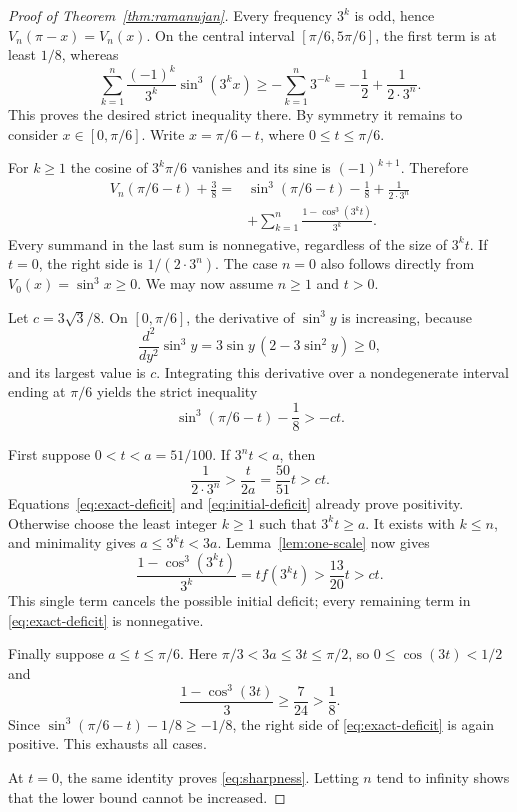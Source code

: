 \documentclass[11pt,a4paper]{article}
\numberwithin{equation}{section}
\theoremstyle{remark}
\begin{document}
\begin{proof}[Proof of Theorem~\ref{thm:ramanujan}]
Every frequency $3^k$ is odd, hence
$V_n(\pi-x)=V_n(x)$. On the central interval
$[\pi/6,5\pi/6]$, the first term is at least $1/8$, whereas
\[
 \sum_{k=1}^n\frac{(-1)^k}{3^k}\sin^3(3^kx)
 \ge-\sum_{k=1}^n3^{-k}
 =-\frac12+\frac1{2\cdot3^n}.
\]
This proves the desired strict inequality there. By symmetry it remains
to consider $x\in[0,\pi/6]$. Write $x=\pi/6-t$, where
$0\le t\le\pi/6$.

For $k\ge1$ the cosine of $3^k\pi/6$ vanishes and its sine is
$(-1)^{k+1}$. Therefore
\begin{equation}\label{eq:exact-deficit}
\begin{split}
 V_n(\pi/6-t)+\frac38
  ={}&\sin^3(\pi/6-t)-\frac18+\frac1{2\cdot3^n}\\
     &+\sum_{k=1}^n\frac{1-\cos^3(3^kt)}{3^k}.
\end{split}
\end{equation}
Every summand in the last sum is nonnegative, regardless of the size
of $3^kt$. If $t=0$, the right side is $1/(2\cdot3^n)$.
The case $n=0$ also follows directly from $V_0(x)=\sin^3x\ge0$.
We may now assume $n\ge1$ and $t>0$.

Let $c=3\sqrt3/8$. On $[0,\pi/6]$, the derivative of
$\sin^3 y$ is increasing, because
\[
 \frac{d^2}{dy^2}\sin^3y=3\sin y\,(2-3\sin^2y)\ge0,
\]
and its largest value is $c$. Integrating this derivative over a
nondegenerate interval ending at $\pi/6$ yields the strict inequality
\begin{equation}\label{eq:initial-deficit}
 \sin^3(\pi/6-t)-\frac18>-ct.
\end{equation}

First suppose $0<t<a=51/100$. If $3^nt<a$, then
\[
 \frac{1}{2\cdot3^n}>\frac{t}{2a}
 =\frac{50}{51}t>ct.
\]
Equations~\eqref{eq:exact-deficit} and \eqref{eq:initial-deficit}
already prove positivity. Otherwise choose the least integer $k\ge1$
such that $3^kt\ge a$. It exists with $k\le n$, and minimality gives
$a\le3^kt<3a$. Lemma~\ref{lem:one-scale} now gives
\[
 \frac{1-\cos^3(3^kt)}{3^k}
 =t f(3^kt)>\frac{13}{20}t>ct.
\]
This single term cancels the possible initial deficit; every remaining
term in \eqref{eq:exact-deficit} is nonnegative.

Finally suppose $a\le t\le\pi/6$. Here
$\pi/3<3a\le3t\le\pi/2$, so $0\le\cos(3t)<1/2$ and
\[
 \frac{1-\cos^3(3t)}3\ge\frac7{24}>\frac18.
\]
Since $\sin^3(\pi/6-t)-1/8\ge-1/8$, the right side of
\eqref{eq:exact-deficit} is again positive. This exhausts all cases.

At $t=0$, the same identity proves \eqref{eq:sharpness}.
Letting $n$ tend to infinity shows that the lower bound cannot be
increased.
\end{proof}
\end{document}

